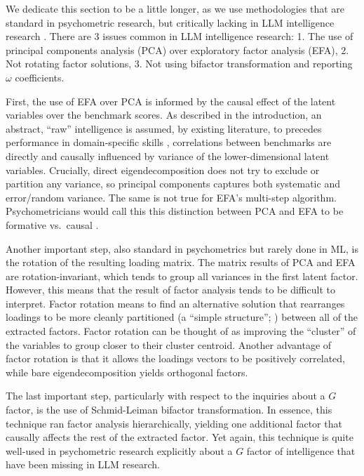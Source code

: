 \documentclass{article} %
\begin{document}
We dedicate this section to be a little longer, as we use methodologies that are standard in psychometric research, but critically lacking in LLM intelligence research
\citep{ilicagignac2024,burnell2023,ye2025}. There are 3 issues common in LLM intelligence research: 1. The use of principal components analysis (PCA) over exploratory factor analysis (EFA), 2. Not
rotating factor solutions, 3. Not using bifactor transformation and reporting \(\omega\) coefficients.

First, the use of EFA over PCA is informed by the causal effect of the latent variables over the benchmark scores. As described in the introduction, an abstract, ``raw'' intelligence is assumed, by
existing literature, to precedes performance in domain-specific skills \citep{schneider2018}, correlations between benchmarks are directly and causally influenced by variance of the lower-dimensional
latent variables. Crucially, direct eigendecomposition does not try to exclude or partition any variance, so principal components captures both systematic and error/random variance. The same is not
true for EFA's multi-step algorithm. Psychometricians would call this this distinction between PCA and EFA to be formative vs.~causal \citep{vandermaas2014}.

Another important step, also standard in psychometrics but rarely done in ML, is the rotation of the resulting loading matrix. The matrix results of PCA and EFA are rotation-invariant, which tends to
group all variances in the first latent factor. However, this means that the result of factor analysis tends to be difficult to interpret. Factor rotation means to find an alternative solution that
rearranges loadings to be more cleanly partitioned (a ``simple structure''; \citealp{gorsuch1983}) between all of the extracted factors. Factor rotation can be thought of as improving the ``cluster''
of the variables to group closer to their cluster centroid. Another advantage of factor rotation is that it allows the loadings vectors to be positively correlated, while bare eigendecomposition
yields orthogonal factors.

The last important step, particularly with respect to the inquiries about a \(G\) factor, is the use of Schmid-Leiman \citep{schmidleiman1957} bifactor transformation. In essence, this technique ran
factor analysis hierarchically, yielding one additional factor that causally affects the rest of the extracted factor. Yet again, this technique is quite well-used in psychometric research explicitly
about a \(G\) factor of intelligence \citep{johnson2004,johnson2008} that have been missing in LLM research.
\end{document}
